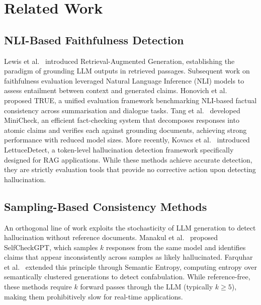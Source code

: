 \documentclass[conference]{IEEEtran}
\begin{document}
\section{Related Work}

\subsection{NLI-Based Faithfulness Detection}

Lewis et al.~\cite{lewis2020rag} introduced Retrieval-Augmented Generation, establishing the paradigm of grounding LLM outputs in retrieved passages. Subsequent work on faithfulness evaluation leveraged Natural Language Inference (NLI) models to assess entailment between context and generated claims. Honovich et al.~\cite{honovich2022true} proposed TRUE, a unified evaluation framework benchmarking NLI-based factual consistency across summarisation and dialogue tasks. Tang et al.~\cite{tang2024minicheck} developed MiniCheck, an efficient fact-checking system that decomposes responses into atomic claims and verifies each against grounding documents, achieving strong performance with reduced model sizes. More recently, Kovacs et al.~\cite{kovacs2025lettucedetect} introduced LettuceDetect, a token-level hallucination detection framework specifically designed for RAG applications. While these methods achieve accurate detection, they are strictly evaluation tools that provide no corrective action upon detecting hallucination.

\subsection{Sampling-Based Consistency Methods}

An orthogonal line of work exploits the stochasticity of LLM generation to detect hallucination without reference documents. Manakul et al.~\cite{manakul2023selfcheckgpt} proposed SelfCheckGPT, which samples $k$ responses from the same model and identifies claims that appear inconsistently across samples as likely hallucinated. Farquhar et al.~\cite{farquhar2024semantic} extended this principle through Semantic Entropy, computing entropy over semantically clustered generations to detect confabulation. While reference-free, these methods require $k$ forward passes through the LLM (typically $k \geq 5$), making them prohibitively slow for real-time applications.
\end{document}

